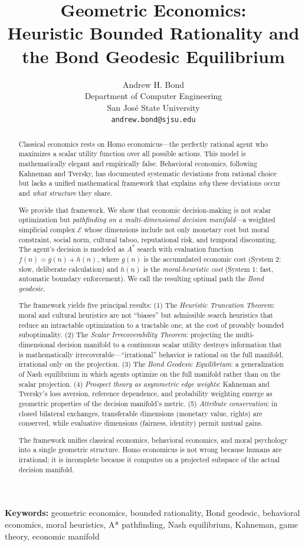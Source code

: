 \documentclass[12pt]{article}
\title{\textbf{Geometric Economics:\\Heuristic Bounded Rationality and the Bond Geodesic Equilibrium}}
\author{Andrew H. Bond\\
Department of Computer Engineering\\
San Jos\'{e} State University\\
\texttt{andrew.bond@sjsu.edu}}
\date{}
\theoremstyle{definition}
\theoremstyle{remark}
\newcommand{\E}{\mathcal{E}}               %
\begin{document}
\maketitle

\noindent\textbf{Keywords:} geometric economics, bounded rationality, Bond geodesic, behavioral economics, moral heuristics, A* pathfinding, Nash equilibrium, Kahneman, game theory, economic manifold

\begin{abstract}
Classical economics rests on Homo economicus---the perfectly rational agent who maximizes a scalar utility function over all possible actions.  This model is mathematically elegant and empirically false.  Behavioral economics, following Kahneman and Tversky, has documented systematic deviations from rational choice but lacks a unified mathematical framework that explains \emph{why} these deviations occur and \emph{what structure} they share.

We provide that framework.  We show that economic decision-making is not scalar optimization but \emph{pathfinding on a multi-dimensional decision manifold}---a weighted simplicial complex $\E$ whose dimensions include not only monetary cost but moral constraint, social norm, cultural taboo, reputational risk, and temporal discounting.  The agent's decision is modeled as $A^*$ search with evaluation function $f(n) = g(n) + h(n)$, where $g(n)$ is the accumulated economic cost (System 2: slow, deliberate calculation) and $h(n)$ is the \emph{moral-heuristic cost} (System 1: fast, automatic boundary enforcement).  We call the resulting optimal path the \emph{Bond geodesic}.

The framework yields five principal results:  (1) The \emph{Heuristic Truncation Theorem}: moral and cultural heuristics are not ``biases'' but admissible search heuristics that reduce an intractable optimization to a tractable one, at the cost of provably bounded suboptimality.  (2) The \emph{Scalar Irrecoverability Theorem}: projecting the multi-dimensional decision manifold to a continuous scalar utility destroys information that is mathematically irrecoverable---``irrational'' behavior is rational on the full manifold, irrational only on the projection.  (3) The \emph{Bond Geodesic Equilibrium}: a generalization of Nash equilibrium in which agents optimize on the full manifold rather than on the scalar projection.  (4) \emph{Prospect theory as asymmetric edge weights}: Kahneman and Tversky's loss aversion, reference dependence, and probability weighting emerge as geometric properties of the decision manifold's metric.  (5) \emph{Attribute conservation}: in closed bilateral exchanges, transferable dimensions (monetary value, rights) are conserved, while evaluative dimensions (fairness, identity) permit mutual gains.

The framework unifies classical economics, behavioral economics, and moral psychology into a single geometric structure.  Homo economicus is not wrong because humans are irrational; it is incomplete because it computes on a projected subspace of the actual decision manifold.
\end{abstract}
\end{document}
